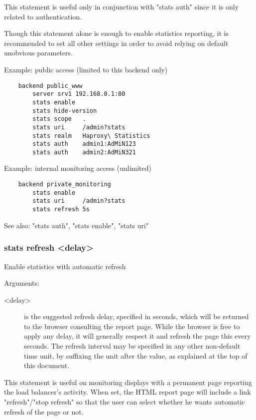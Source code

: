   This statement is useful only in conjunction with "stats auth" since it is
  only related to authentication.

  Though this statement alone is enough to enable statistics reporting, it is
  recommended to set all other settings in order to avoid relying on default
  unobvious parameters.

  Example: public access (limited to this backend only)
  \begin{verbatim}
    backend public_www
        server srv1 192.168.0.1:80
        stats enable
        stats hide-version
        stats scope   .
        stats uri     /admin?stats
        stats realm   Haproxy\ Statistics
        stats auth    admin1:AdMiN123
        stats auth    admin2:AdMiN321
   \end{verbatim}

   Example: internal monitoring access (unlimited)
   \begin{verbatim}
    backend private_monitoring
        stats enable
        stats uri     /admin?stats
        stats refresh 5s
   \end{verbatim}

  See also: "stats auth", "stats enable", "stats uri"

\subsubsection[stats refresh]{stats refresh <delay>}


  Enable statistics with automatic refresh


  Arguments:
  \begin{description}
  \item[<delay>] is the suggested refresh delay, specified in seconds, which will
              be returned to the browser consulting the report page. While the
              browser is free to apply any delay, it will generally respect it
              and refresh the page this every seconds. The refresh interval may
              be specified in any other non-default time unit, by suffixing the
              unit after the value, as explained at the top of this document.
  \end{description}

  This statement is useful on monitoring displays with a permanent page
  reporting the load balancer's activity. When set, the HTML report page will
  include a link "refresh"/"stop refresh" so that the user can select whether
  he wants automatic refresh of the page or not.

